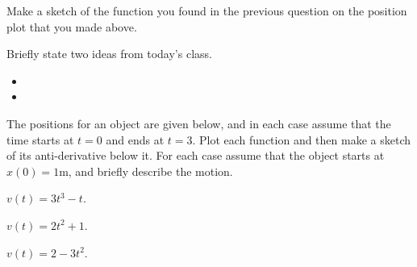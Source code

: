 \begin{problem}
\begin{subproblem}
    \vspace{3em}

  \item Make a sketch of the function you found in the previous
    question on the position plot that you made above.

  \end{subproblem}

\postClass

\begin{problem}
\item Briefly state two ideas from today's class.
  \begin{itemize}
  \item 
  \item 
  \end{itemize}

\item The positions for an object are given below, and in each case
  assume that the time starts at $t=0$ and ends at $t=3$. Plot each
  function and then make a sketch of its anti-derivative below it.
  For each case assume that the object starts at $x(0)=1$m, and
  briefly describe the motion.

  \begin{subproblem}
    \item $v(t)= 3t^3-t$.
      \vfill
    \item $v(t)=2t^2 + 1$.
      \vfill
    \item $v(t)=2-3t^2$.
      \vfill
  \end{subproblem}

\end{problem}
\end{problem}



